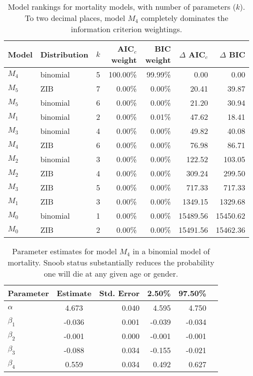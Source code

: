 \documentclass[11pt]{article}
\begin{document}
\begin{table}[htbp]
  \centering
  
    \begin{tabular}{llrrrrr}
    \hline
    \hline
    Model & Distribution & $k$     & AIC$_c$ weight & BIC weight & $\Delta$ AIC$_c$ & $\Delta$ BIC \\
    \hline
    $M_4$    & binomial & 5     & 100.00\% & 99.99\% & 0.00  & 0.00 \\
    $M_5$   & ZIB   & 7     & 0.00\% & 0.00\% & 20.41 & 39.87 \\
    $M_5$    & binomial & 6     & 0.00\% & 0.00\% & 21.20 & 30.94 \\
    $M_1$    & binomial & 2     & 0.00\% & 0.01\% & 47.62 & 18.41 \\
    $M_3$    & binomial & 4     & 0.00\% & 0.00\% & 49.82 & 40.08 \\
    $M_4$   & ZIB   & 6     & 0.00\% & 0.00\% & 76.98 & 86.71 \\
    $M_2$    & binomial & 3     & 0.00\% & 0.00\% & 122.52 & 103.05 \\
    $M_2$   & ZIB   & 4     & 0.00\% & 0.00\% & 309.24 & 299.50 \\
    $M_3$   & ZIB   & 5     & 0.00\% & 0.00\% & 717.33 & 717.33 \\
    $M_1$   & ZIB   & 3     & 0.00\% & 0.00\% & 1349.15 & 1329.68 \\
    $M_0$    & binomial & 1     & 0.00\% & 0.00\% & 15489.56 & 15450.62 \\
    $M_0$   & ZIB   & 2     & 0.00\% & 0.00\% & 15491.56 & 15462.36 \\
    \hline
    \end{tabular}%
    \caption{Model rankings for mortality models, with number of parameters ($k$).  To two decimal places, model $M_4$ completely dominates the information criterion weightings.}
  \label{tab:morttab}%
\end{table}%


\begin{table}[htbp]
  \centering
    \begin{tabular}{lcrrrr}
    \hline
    \hline
    Parameter & Estimate & Std. Error & 2.50\% & 97.50\% \\
    \hline
    $\alpha$    & 4.673 & 0.040 & 4.595 & 4.750 \\
    $\beta_1$    & -0.036 & 0.001 & -0.039 & -0.034 \\
    $\beta_2$    & -0.001 & 0.000 & -0.001 & -0.001 \\
    $\beta_3$    & -0.088 & 0.034 & -0.155 & -0.021 \\
    $\beta_4$    & 0.559 & 0.034 & 0.492 & 0.627 \\
    \hline
    \end{tabular}%
    \caption{Parameter estimates for model $M_{4}$ in a binomial model of mortality.  Snoob status substantially reduces the probability one will die at any given age or gender.} 
  \label{tab:m10ests}%
\end{table}%
\end{document}
